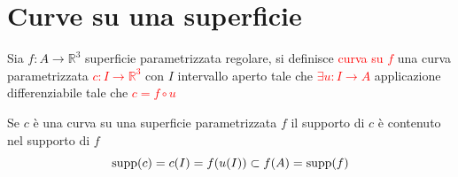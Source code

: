     \section{Curve su una superficie}
        \begin{definizione}
        Sia $f \colon A \to \mathbb{R}^3$ superficie parametrizzata regolare, si definisce
        \textcolor{red}{curva su $f$} una curva parametrizzata \textcolor{red}{$c \colon I \to \mathbb{R}^3$} con $I$ intervallo aperto tale che 
        \textcolor{red}{$\exists u \colon I \to A$} applicazione differenziabile
        tale che \textcolor{red}{$c= f \circ u$}
        \end{definizione}
        \begin{osservazione}
        Se $c$ è una curva su una superficie parametrizzata $f$ il supporto di $c$ è contenuto nel supporto di $f$
        \[ \operatorname{supp}(c)=c(I)=f(u(I)) \subset f(A)= \operatorname{supp}(f) \]
        \end{osservazione}
